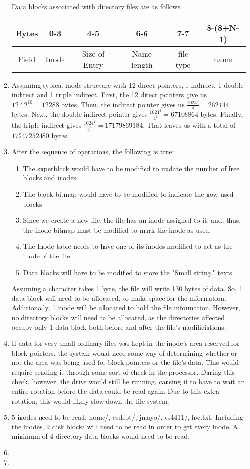 \documentclass[12pt,letterpaper]{report}
\begin{document}
\begin{enumerate}
Data blocks associated with directory files are as follows\\
\begin{tabular}{|c|c|c|c|c|c|}
\hline
Bytes & 0-3 & 4-5 & 6-6 & 7-7 & 8-(8+N-1) \\
\hline
Field & Inode & Size of Entry & Name length & file type & name\\
\hline
\end{tabular}
\item Assuming typical inode structure with 12 direct pointers, 1 indirect, 1 double indirect and 1 triple indirect. First, the 12 direct pointers give us $12 * 2^{10} = 12288$ bytes. Then, the indirect pointer gives us $\frac{1024^2}{4} = 262144$ bytes. Next, the double indirect pointer gives $\frac{1024^3}{4^2} = 67108864$ bytes. Finally, the triple indirect gives $\frac{1024^4}{4^3} = 17179869184$. That leaves us with a total of $17247252480$ bytes.

\item After the sequence of operations, the following is true:
\begin{enumerate}
\item The superblock would have to be modified to update the number of free blocks and
inodes.
\item The block bitmap would have to be modified to indicate the now used blocks
\item Since we create a new file, the file has an inode assigned to it, and, thus,
the inode bitmap must be modified to mark the inode as used.
\item The Inode table needs to have one of its inodes modified to act as the inode of the
file. 
\item Data blocks will have to be modified to store the "Small string." texts
\end{enumerate}
Assuming a character takes 1 byte, the file will write 130 bytes of data. So, 1 data block
will need to be allocated, to make space for the information. Additionally, 1 inode will be
allocated to hold the file information. However, no directory blocks will need to be
allocated, as the directories affected occupy only 1 data block both before and after the
file's modificiations. 
\item If data for very small ordinary files was kept in the inode's area reserved for block
pointers, the system would need some way of determining whether or not the area was being
used for block pointers or the file's data. This would require sending it through some sort
of check in the processor. During this check, however, the drive would still be running,
causing it to have to wait an entire rotation before the data could be read again.
Due to this extra rotation, this would likely slow down the file system. 

\item 5 inodes need to be read: home/, csdept/, jmayo/, cs4411/, hw.txt. Including the 
inodes, 9 disk blocks will need to be read in order to get every inode. A minimum of
4 directory data blocks would need to be read.   

\item

\item



\end{enumerate}
\end{document}
